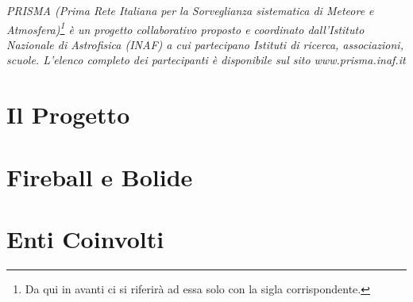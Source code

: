 \begin{center}
\emph{PRISMA (Prima Rete Italiana per la Sorveglianza sistematica di Meteore e
Atmosfera)\footnote{Da qui in avanti ci si riferirà ad essa solo con la sigla corrispondente.} è un progetto collaborativo proposto e coordinato dall’Istituto Nazionale
di Astrofisica (INAF) a cui partecipano Istituti di ricerca, associazioni, scuole.
L’elenco completo dei partecipanti è disponibile sul sito www.prisma.inaf.it}
\end{center}

\section{Il Progetto}


\section{Fireball e Bolide}


\section{Enti Coinvolti}


